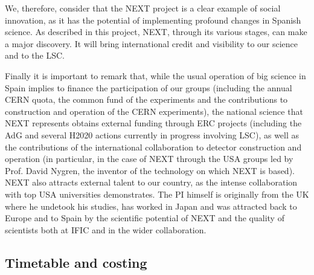 \documentclass[a4paper,11pt,oneside]{article}
\begin{document}
We, therefore, consider that the NEXT project is a clear example of social innovation, as it has the potential of implementing profound changes in Spanish science. As described in this project, NEXT, through its various stages, can make a major discovery. It will bring international credit and visibility to our science and to the LSC. %


Finally it is important to remark that, while the usual operation of
big science in Spain implies to finance the participation of our
groups (including the annual CERN quota, the common fund of the
experiments and the contributions to construction and operation of the
CERN experiments), the national science that NEXT represents obtains
external funding through ERC projects (including the AdG and several
H2020 actions currently in progress involving LSC), as well as the
contributions of the international collaboration to detector
construction and operation (in particular, in the case of NEXT through
the USA groups led by Prof. David Nygren, the inventor of the
technology on which NEXT is based). NEXT also attracts external talent
to our country, as the intense collaboration with top USA universities
demonstrates. The PI himself is originally from the UK where he
undetook his studies, has worked in Japan and was attracted back to
Europe and to Spain by the scientific potential of NEXT and the
quality of scientists both at IFIC and in the wider collaboration.


\subsection*{Timetable and costing}
\end{document}

